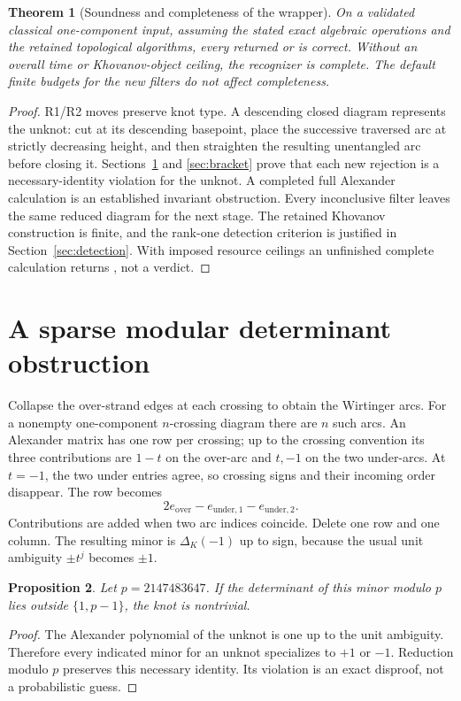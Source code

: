 \documentclass[11pt]{article}
\newtheorem{theorem}{Theorem}[section]
\newtheorem{proposition}[theorem]{Proposition}
\theoremstyle{remark}\newtheorem{remark}[theorem]{Remark}
\newcommand{\code}[1]{\texttt{\detokenize{#1}}}
\begin{document}
\begin{theorem}[Soundness and completeness of the wrapper]
On a validated classical one-component input, assuming the stated exact
algebraic operations and the retained topological algorithms, every returned
\code{UNKNOT} or \code{KNOTTED} is correct. Without an overall time or
Khovanov-object ceiling, the recognizer is complete. The default finite
budgets for the new filters do not affect completeness.
\end{theorem}
\begin{proof}
R1/R2 moves preserve knot type. A descending closed diagram represents the
unknot: cut at its descending basepoint, place the successive traversed arc at
strictly decreasing height, and then straighten the resulting unentangled arc
before closing it. Sections~\ref{sec:det} and \ref{sec:bracket} prove that each
new rejection is a necessary-identity violation for the unknot. A completed
full Alexander calculation is an established invariant obstruction.
Every inconclusive filter leaves the same reduced diagram for the next stage.
The retained Khovanov construction is finite, and the rank-one detection
criterion is justified in Section~\ref{sec:detection}. With imposed resource
ceilings an unfinished complete calculation returns \code{UNKNOWN}, not a
verdict.
\end{proof}

\section{A sparse modular determinant obstruction}
\label{sec:det}
Collapse the over-strand edges at each crossing to obtain the Wirtinger arcs.
For a nonempty one-component $n$-crossing diagram there are $n$ such arcs. An
Alexander matrix has one row per crossing; up to the crossing convention its
three contributions are $1-t$ on the over-arc and $t,-1$ on the two under-arcs.
At $t=-1$, the two under entries agree, so crossing signs and their incoming
order disappear. The row becomes
\begin{equation}
 2e_{\mathrm{over}}-e_{\mathrm{under,1}}-e_{\mathrm{under,2}}.
 \label{eq:foxminusone}
\end{equation}
Contributions are added when two arc indices coincide. Delete one row and one
column. The resulting minor is $\Delta_K(-1)$ up to sign, because the usual
unit ambiguity $\pm t^j$ becomes $\pm1$.

\begin{proposition}
Let $p=2147483647$. If the determinant of this minor modulo $p$ lies outside
$\{1,p-1\}$, the knot is nontrivial.
\end{proposition}
\begin{proof}
The Alexander polynomial of the unknot is one up to the unit ambiguity.
Therefore every indicated minor for an unknot specializes to $+1$ or $-1$.
Reduction modulo $p$ preserves this necessary identity. Its violation is an
exact disproof, not a probabilistic guess.
\end{proof}
\end{document}
